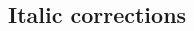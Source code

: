 \documentclass{article}
\begin{document}
\begin{multicols}{3}
\subsection{Italic corrections}

\begin{mtable}

\end{mtable}

\end{multicols}
\end{document}
